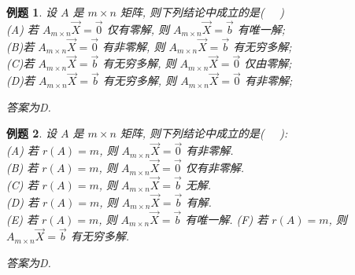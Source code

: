 \documentclass[a4paper]{book}
\newtheorem{eg}{例题}[chapter]
\begin{document}
\begin{eg}
设 $A$ 是 $m\times n$ 矩阵,  则下列结论中成立的是(    \ \     )  \\
(A) 若 $A_{m\times n}\vec{X}=\vec{0}$ 仅有零解,   则 $A_{m\times n}\vec{X}=\vec{b}$ 有唯一解;\\
(B)若 $A_{m\times n}\vec{X}=\vec{0}$ 有非零解,   则 $A_{m\times n}\vec{X}=\vec{b}$ 有无穷多解;\\
(C)若 $A_{m\times n}\vec{X}=\vec{b}$ 有无穷多解,   则 $A_{m\times n}\vec{X}=\vec{0}$ 仅由零解;\\
(D)若 $A_{m\times n}\vec{X}=\vec{b}$ 有无穷多解,   则 $A_{m\times n}\vec{X}=\vec{0}$ 有非零解;

答案为D.
\end{eg}


\begin{eg}
设 $A$ 是 $m\times n$ 矩阵,  则下列结论中成立的是( \ \ ):\\
(A) 若 $r(A) = m$,  则 $A_{m\times n}\vec{X}=\vec{0}$  有非零解.\\
(B) 若 $r(A) = m$,  则 $A_{m\times n}\vec{X}=\vec{0}$  仅有非零解.\\
(C) 若 $r(A) = m$,  则 $A_{m\times n}\vec{X}=\vec{b}$  无解.\\
(D) 若 $r(A) = m$,  则 $A_{m\times n}\vec{X}=\vec{b}$ 有解.\\
(E) 若 $r(A) = m$,  则 $A_{m\times n}\vec{X}=\vec{b}$ 有唯一解.
(F) 若 $r(A) = m$,  则 $A_{m\times n}\vec{X}=\vec{b}$ 有无穷多解.

答案为D.
\end{eg}
\end{document}
